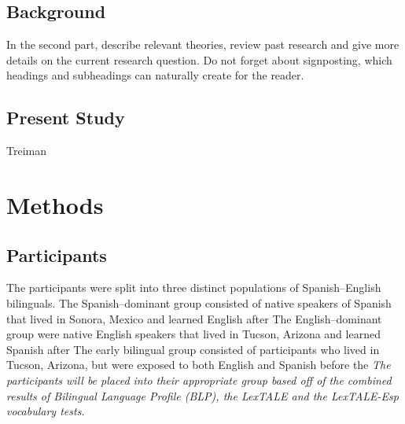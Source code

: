 \subsection{Background}

In the second part, describe relevant theories, review past research and give more details on the current research question. Do not forget about signposting, which headings and subheadings can naturally create for the reader.


\subsection{Present Study}
Treiman



\section{Methods}


\subsection{Participants}

The participants were split into three distinct populations of Spanish–English bilinguals. The Spanish–dominant group consisted of native speakers of Spanish that lived in Sonora, Mexico and learned English after %
The English–dominant group were native English speakers that lived in Tucson, Arizona and learned Spanish after%
The early bilingual group consisted of participants who lived in Tucson, Arizona, but were exposed to both English and Spanish before the %
\emph{The participants will be placed into their appropriate group based off of the combined results of Bilingual Language Profile (BLP), the LexTALE and the LexTALE-Esp vocabulary tests.} 

